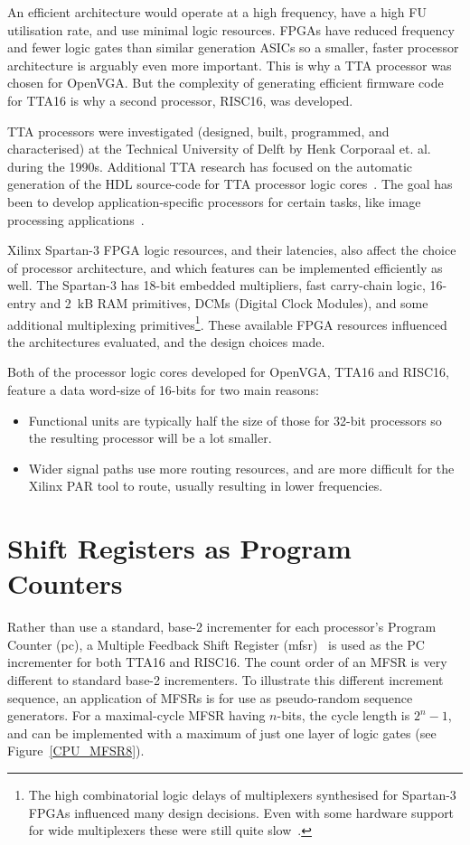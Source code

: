 An efficient architecture would operate at a high frequency, have a high FU
utilisation rate, and use minimal logic resources. FPGAs have reduced frequency
and fewer logic gates than similar generation ASICs so a smaller, faster
processor architecture is arguably even more important. This is why a TTA
processor was chosen for OpenVGA. But the complexity of generating efficient
firmware code for TTA16 is why a second processor, RISC16, was developed.

TTA processors were investigated (designed, built, programmed, and characterised)
at the Technical University of Delft by Henk Corporaal et.
al.~\cite{corporaal1999tmi, corporaal:tta, corporaal1993maa} during the 1990s.
Additional TTA research has focused on the automatic generation of the HDL
source-code for TTA processor logic cores~\cite{hoogerbrugge1995ast,
jaaskelainen2007cta}. The goal has been to develop application-specific
processors for certain tasks, like image processing
applications~\cite{corporaal1999tmi}.

Xilinx Spartan-3 FPGA logic resources, and their latencies, also affect the
choice of processor architecture, and which features can be implemented
efficiently as well. The Spartan-3 has 18-bit embedded multipliers, fast
carry-chain logic, 16-entry and 2~kB RAM primitives, DCMs (Digital Clock
Modules), and some additional multiplexing primitives\footnote{The high
combinatorial logic delays of multiplexers synthesised for Spartan-3 FPGAs
influenced many design decisions. Even with some hardware support for wide
multiplexers these were still quite slow~\cite{Xilinx_SP3_DS}.}. These available
FPGA resources influenced the architectures evaluated, and the design choices
made.

Both of the processor logic cores developed for OpenVGA, TTA16 and RISC16,
feature a data word-size of 16-bits for two main reasons:
\begin{itemize}
  \item Functional units are typically half the size of those for 32-bit
  processors so the resulting processor will be a lot smaller.
  \item Wider signal paths use more routing resources, and are more difficult
  for the Xilinx PAR tool to route, usually resulting in lower frequencies.
\end{itemize}


\section{Shift Registers as Program Counters}
Rather than use a standard, base-2 incrementer for each processor's Program
Counter (\gls{pc}), a Multiple
Feedback Shift Register (\gls{mfsr})~\cite{MFSR_List} is used as the PC incrementer for both
TTA16 and RISC16. The count order of an MFSR is very different to standard base-2
incrementers. To illustrate this different increment sequence, an application of
MFSRs is for use as pseudo-random sequence generators. For a maximal-cycle MFSR
having $n$-bits, the cycle length is $2^n-1$, and can be implemented with a
maximum of just one layer of logic gates (see Figure~\ref{CPU_MFSR8}).


